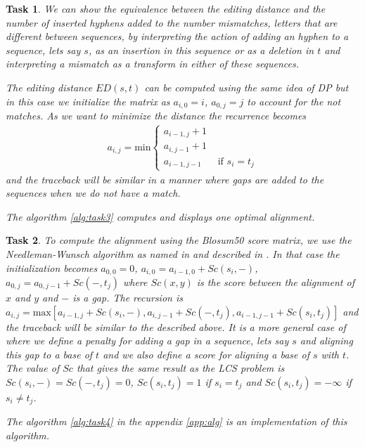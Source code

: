 \documentclass[11pt]{article} %
\theoremstyle{problemstyle}
\newtheorem{exercise}{Task}	%
\theoremstyle{problemstyle}
\begin{document}
\begin{exercise} %
We can show the equivalence between the editing distance and the number of inserted hyphens added to the number mismatches, letters that are  different between sequences, by interpreting the action of adding an hyphen to a sequence, lets say $s$, as an insertion in this sequence or as a deletion in $t$ and interpreting a mismatch as a transform in either of these sequences.

The editing distance $ED(s,t)$ can be computed using the same idea of DP but in this case we initialize the matrix as $a_{i,0} = i$, $a_{0,j} = j$ to account for the not matches. As we want to minimize the distance the recurrence becomes
\begin{align*}
a_{i,j}=\text{min}
\begin{cases}
a_{i-1,j}+1 &\\
a_{i,j-1}+1 &\\
a_{i-1,j-1} &\text{ if } s_i=t_j
\end{cases}
\end{align*}
and the traceback will be similar in a manner where gaps are added to the sequences when we do not have a match. 

The algorithm \ref{alg:task3} computes and displays one optimal alignment.
 
\end{exercise}

\begin{exercise} %
	\begin{sloppypar}
To compute the alignment using the Blosum50 score matrix, we use the Needleman-Wunsch algorithm as named in \cite{durbin} and described in \cite{jones}. In that case the initialization becomes $a_{0,0}=0$, $a_{i,0} = a_{i-1,0} + Sc(s_i,-)$, $a_{0,j} = a_{0,j-1} + Sc(-,t_j)$ where $Sc(x,y)$ is the score between the alignment of $x$ and $y$ and $-$ is a gap. The recursion is ${
a_{i,j}=\text{max}[a_{i-1,j}+Sc(s_i,-), a_{i,j-1}+Sc(-,t_j),a_{i-1,j-1}+Sc(s_i,t_j)]}$
and the traceback will be similar to the described above. It is a more general case of  where we define a penalty for adding a gap in a sequence, lets say $s$ and aligning this gap to a base of $t$ and we also define a score for aligning a base of $s$ with $t$. The value of $Sc$ that gives the same result as the LCS problem is $Sc(s_i,-)=Sc(-,t_j)=0$, $Sc(s_i,t_j)=1$ if $s_i=t_j$ and $Sc(s_i,t_j)=-\infty$ if $s_i \neq t_j$.
	\end{sloppypar}
The algorithm \ref{alg:task4} in the appendix \ref{app:alg} is an implementation of this algorithm.

\end{exercise}
\end{document}
